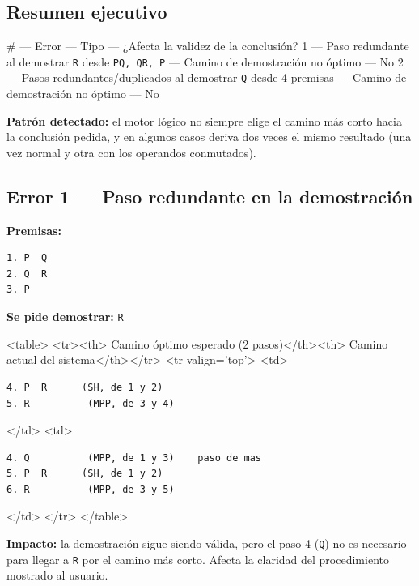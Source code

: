 \documentclass[11pt,a4paper,openany]{book}
\begin{document}
\hrulefill

\subsection{Resumen ejecutivo}

\# --- Error --- Tipo --- ¿Afecta la validez de la conclusión?
1 --- Paso redundante al demostrar \texttt{R} desde \texttt{PQ, QR, P} --- Camino de demostración no óptimo --- No
2 --- Pasos redundantes/duplicados al demostrar \texttt{Q} desde 4 premisas --- Camino de demostración no óptimo --- No

\textbf{Patrón detectado:} el motor lógico no siempre elige el camino más corto hacia la conclusión pedida, y en algunos casos deriva dos veces el mismo resultado (una vez normal y otra con los operandos conmutados).

\hrulefill

\subsection{Error 1 --- Paso redundante en la demostración}

\textbf{Premisas:}

\begin{lstlisting}[language={},basicstyle=\ttfamily\scriptsize]
1. P  Q
2. Q  R
3. P
\end{lstlisting}

\textbf{Se pide demostrar:} \texttt{R}

<table>
<tr><th> Camino óptimo esperado (2 pasos)</th><th> Camino actual del sistema</th></tr>
<tr valign='top'>
<td>

\begin{lstlisting}[language={},basicstyle=\ttfamily\scriptsize]
4. P  R      (SH, de 1 y 2)
5. R          (MPP, de 3 y 4)
\end{lstlisting}

</td>
<td>

\begin{lstlisting}[language={},basicstyle=\ttfamily\scriptsize]
4. Q          (MPP, de 1 y 3)    paso de mas
5. P  R      (SH, de 1 y 2)
6. R          (MPP, de 3 y 5)
\end{lstlisting}

</td>
</tr>
</table>

\textbf{Impacto:} la demostración sigue siendo válida, pero el paso 4 (\texttt{Q}) no es necesario para llegar a \texttt{R} por el camino más corto. Afecta la claridad del procedimiento mostrado al usuario.
\end{document}
